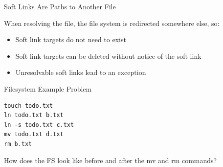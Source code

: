   \begin{frame}{Soft Links Are Paths to Another File}

    \begin{center}
        

    \end{center}

    When resolving the file, the file system is redirected somewhere else, so:
    \begin{itemize}
      \item Soft link targets do not need to exist
      \item Soft link targets can be deleted without notice of the soft link
      \item Unresolvable soft links lead to an exception
    \end{itemize}
  \end{frame}

  \begin{frame}[fragile]{Filesystem Example Problem}
    \begin{lstlisting}
touch todo.txt
ln todo.txt b.txt
ln -s todo.txt c.txt
mv todo.txt d.txt
rm b.txt
    \end{lstlisting}

    \vspace{2em}

    How does the FS look like before and after the mv and rm commands?
  \end{frame}


